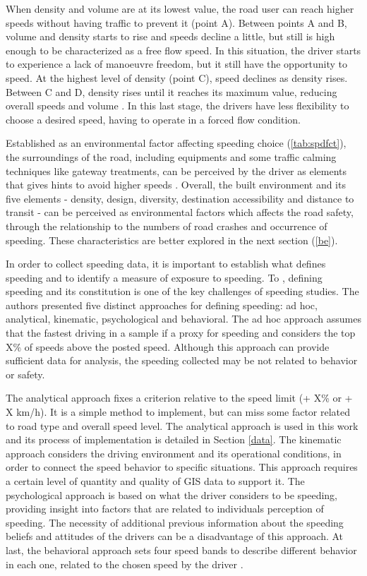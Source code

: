 When density and volume are at its lowest value, the road user can reach higher speeds without having traffic to prevent it (point A). Between points A and B, volume and density starts to rise and speeds decline a little, but still is high enough to be characterized as a free flow speed. In this situation, the driver starts to experience a lack of manoeuvre freedom, but it still have the opportunity to speed. At the highest level of density (point C), speed declines as density rises. Between C and D, density rises until it reaches its maximum value, reducing overall speeds and volume \cite{Green2020}. In this last stage, the drivers have less flexibility to choose a desired speed, having to operate in a forced flow condition. 

Established as an environmental factor affecting speeding choice (\autoref{tab:spdfct}), the surroundings of the road, including equipments and some traffic calming techniques like gateway treatments, can be perceived by the driver as elements that gives hints to avoid higher speeds \cite{WHO2008}. Overall, the built environment and its five elements - density, design, diversity, destination accessibility and distance to transit - can be perceived as environmental factors which affects the road safety, through the relationship to the numbers of road crashes and occurrence of speeding. These characteristics are better explored in the next section (\ref{be}). 

In order to collect speeding data, it is important to establish what defines speeding and to identify a measure of exposure to speeding. To \textcite{Richard2013}, defining speeding and its constitution is one of the key challenges of speeding studies. The authors presented five distinct approaches for defining speeding: ad hoc, analytical, kinematic, psychological and behavioral. The ad hoc approach assumes that the fastest driving in a sample if a proxy for speeding and considers the top X\% of speeds above the posted speed. Although this approach can provide sufficient data for analysis, the speeding collected may be not related to behavior or safety. 

The analytical approach fixes a criterion relative to the speed limit (+ X\% or + X km/h). It is a simple method to implement, but can miss some factor related to road type and overall speed level. The analytical approach is used in this work and its process of implementation is detailed in Section \ref{data}. The kinematic approach considers the driving environment and its operational conditions, in order to connect the speed behavior to specific situations. This approach requires a certain level of quantity and quality of GIS data to support it. The psychological approach is based on what the driver considers to be speeding, providing insight into factors that are related to individuals perception of speeding. The necessity of additional previous information about the speeding beliefs and attitudes of the drivers can be a disadvantage of this approach. At last, the behavioral approach sets four speed bands to describe different behavior in each one, related to the chosen speed by the driver \cite{Richard2013}.


